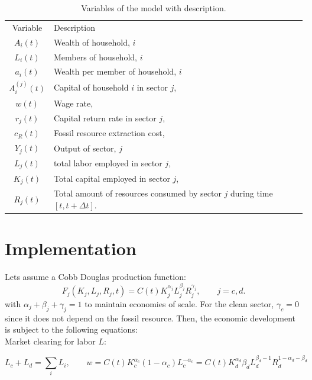 \begin{table}[H]
	\centering
	\begin{tabular}{cl}
		Variable & Description \\
		$A_i(t)$ & Wealth of household, $i$ \\
		$L_i(t)$ & Members of household, $i$ \\
		$a_i(t)$ & Wealth per member of household, $i$ \\
		$A_i^{(j)} (t)$ & Capital of household $i$ in sector $j$, \\
		$w(t)$   & Wage rate, \\
		$r_j(t)$ & Capital return rate in sector $j$, \\
		$c_R(t)$ & Fossil resource extraction cost, \\
		$Y_j(t)$ & Output of sector, $j$ \\
		$L_j(t)$ & total labor employed in sector $j$, \\
		$K_j(t)$ & Total capital employed in sector $j$, \\
		$R_j(t)$ & Total amount of resources consumed by sector $j$ during time $[t, t + \Delta t]$. \\
	\end{tabular}
	\caption{Variables of the model with description.}
	\label{tab:variables}
\end{table}

\section{Implementation}

Lets assume a Cobb Douglas production function:
\begin{equation}
	F_j(K_j,L_j,R_j,t) = C(t)K_j^{\alpha_j}L_j^{\beta_j}R_j^{\gamma_j}, \qquad j = c,d.
	\label{cobb_douglas}
\end{equation}
with $\alpha_j + \beta_j + \gamma_j = 1$ to maintain economies of scale. For the clean sector, $\gamma_c = 0$ since it does not depend on the fossil resource.
Then, the economic development is subject to the following equations:\\

Market clearing for labor $L$:

\begin{equation}
	L_c + L_d = \sum_i L_i, \qquad w = C(t)K_c^{\alpha_c}(1-\alpha_c) L_c^{-\alpha_c}=  C(t)K_d^{\alpha_d}\beta_d L_d^{\beta_d-1}R_d^{1-\alpha_d - \beta_d} 
	\label{labour_market_clearing}
\end{equation}

